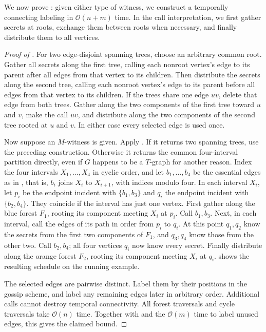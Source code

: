 \documentclass[USenglish, a4paper, thm-restate,numberwithinsect, cleveref]{lipics-v2021}
\newcommand{\Oh}{\mathcal{O}}
\begin{document}
We now prove : given either type of
witness, we construct a temporally connecting labeling in $\Oh(n+m)$
time. In the call interpretation, we first gather secrets at roots,
exchange them between roots when necessary, and finally distribute
them to all vertices.
\begin{proof}[Proof of ]
For two edge-disjoint spanning trees, choose an arbitrary common root.
Gather all secrets along the first tree, calling each nonroot vertex's
edge to its parent after all edges from that vertex to its children.
Then distribute the secrets along the second tree, calling each
nonroot vertex's edge to its parent before all edges from that vertex
to its children. If the trees share one edge $uv$,
delete that edge from both trees. Gather along the two components of
the first tree toward $u$ and $v$, make the call $uv$, and distribute
along the two components of the second tree rooted at $u$ and $v$.
In either case every selected edge is used once.

Now suppose an $M$-witness is given. Apply
. If it returns two spanning trees,
use the preceding construction. Otherwise it returns the common
four-interval partition directly, even if $G$ happens to be
a $T$-graph for another reason.
Index the four intervals $X_1,\ldots,X_4$ in cyclic order, and let
$b_1,\ldots,b_4$ be the essential edges as in , that
is, $b_i$ joins $X_i$ to $X_{i+1}$, with indices modulo four.
In each interval $X_i$, let $p_i$ be the endpoint incident with
$\{b_1,b_3\}$ and $q_i$ the endpoint incident with $\{b_2,b_4\}$.
They coincide if the interval has just one vertex.
First gather along the blue forest $F_1$, rooting its component meeting
$X_i$ at $p_i$.
Call $b_1,b_3$. Next, in each interval, call the edges of its path in
order from $p_i$ to $q_i$. At this point $q_1,q_2$ know the secrets
from the first two components of $F_1$, and $q_3,q_4$ know those from
the other two. Call $b_2,b_4$; all four vertices $q_i$ now know every
secret. Finally distribute along the orange forest $F_2$, rooting its
component meeting $X_i$ at $q_i$.
 shows the resulting schedule on the
running example.

The selected edges are pairwise distinct. Label them by their positions
in the gossip scheme, and label any remaining edges later in arbitrary
order. Additional calls cannot destroy temporal connectivity.
All forest traversals and cycle traversals take $\Oh(n)$ time.
Together with  and the $\Oh(m)$ time
to label unused edges, this gives the claimed bound.
\end{proof}
\end{document}
